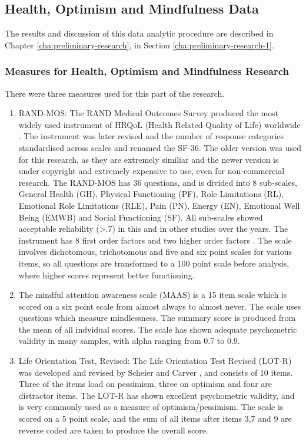 \subsection{Health, Optimism and Mindfulness Data}

The results and discussion of this data analytic procedure are described in Chapter \ref{cha:preliminary-research}, in Section \ref{cha:preliminary-research-1}.

\subsubsection{Measures for Health, Optimism and Mindfulness Research}

There were three measures used for this part of the research.
\begin{enumerate}
\item RAND-MOS: The RAND Medical Outcomes Survey produced the most widely used instrument of HRQoL (Health Related Quality of Life) worldwide \cite{hays1993rand}. The instrument was later revised and the number of response categories standardised across scales and renamed the SF-36. The older version was used for this research, as they are extremely similiar and the newer version is under copyright and extremely expensive to use, even for non-commercial research. The RAND-MOS has 36 questions, and is divided into 8 sub-scales, General Health (GH),
Physical Functioning (PF), Role Limitations (RL), Emotional Role Limitations
(RLE), Pain (PN), Energy (EN), Emotional Well Being (EMWB) and Social
Functioning (SF). All sub-scales showed acceptable reliability
(>.7) in this and in other studies over the years\cite{Lam2007,Ferreira2000}.
The instrument has 8 first order factors and two higher order factors
\cite{Hann2008}. The scale involves dichotomous, trichotomous and
five and six point scales for various items, so all questions are
transformed to a 100 point scale before analysis, where higher scores
represent better functioning.
\item The mindful attention awareness scale (MAAS)
\cite{brown2003benefits} is a 15 item scale which is scored on
a six point scale from almost always to almost never. The scale uses
questions which measure mindlessness. The summary score is produced
from the mean of all indvidual scores. The scale has shown adequate
psychometric validity in many samples, with alpha ranging from 0.7
to 0.9\cite{brown2003benefits,Ruth2006}.
\item Life Orientation Test, Revised: The Life Orientation Test Revised (LOT-R) was developed and revised
by Scheier and Carver \cite{Scheier1994}, and consists of 10 items.
Three of the items load on pessimism, three on optimism and four are
distractor items. The LOT-R has shown excellent psychometric validity,
and is very commonly used as a measure of optimism/pessimism. The
scale is scored on a 5 point scale,
and the sum of all items after items 3,7 and 9 are reverse coded are taken to produce the overall score.
\end{enumerate}



